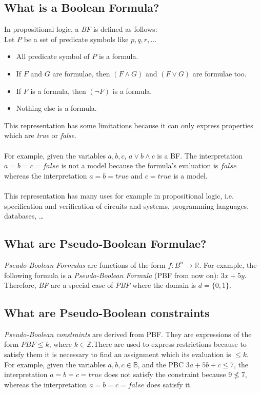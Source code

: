 \subsection{What is a Boolean Formula?}
In propositional logic, a \emph{BF} is defined as follows\cite{Lpo}:\\
Let $P$ be a set of predicate symbols like $p,q,r,...$
\begin{itemize}
	\item All predicate symbol of $P$ is a formula.
	\item If $F$ and $G$ are formulae, then $(F \land G)$ and $(F \lor G)$ are formulae too.
	\item If $F$ is a formula, then $(\neg F)$ is a formula.
	\item Nothing else is a formula.
\end{itemize}
This representation has some limitations because it can only express properties which are \emph{true} or \emph{false}.\\\\
For example, given the variables $a,b,c$, $a \vee b \wedge c$ is a BF. The interpretation $a = b =c = false$ is not a model because the formula's evaluation is $false$ whereas the interpretation $a = b = true $ and $c=true$ is a model.\\\\
This representation has many uses for example in propositional logic, i.e. specification and verification of circuits and systems, programming languages, databases, \ldots


\subsection{What are Pseudo-Boolean Formulae?}

\emph{Pseudo-Boolean Formulas} are functions of the form $f:B^n \rightarrow \mathbb{R}$. For example, the following formula is a \emph{Pseudo-Boolean Formula} (PBF from now on): $3x+5y$. Therefore, \emph{BF} are a special case of \emph{PBF} where the domain is $d=\{0,1\}$.\\

\subsection{What are Pseudo-Boolean constraints}
\emph{Pseudo-Boolean constraints} are derived from PBF. They are expressions of the form $PBF \leq k$, where $k\in \mathbb{Z}$.There are used to express restrictions because to satisfy them it is necessary to find an assignment which its evaluation is $\leq k$.\\
For example, given the variables $a,b,c \in \mathbb{B}$, and the PBC $3a+5b+c \leq 7$, the interpretation $a = b = c = true$ does not satisfy the constraint because $ 9 \nleq 7 $, whereas the interpretation $a =b =c = false$ does satisfy it.


